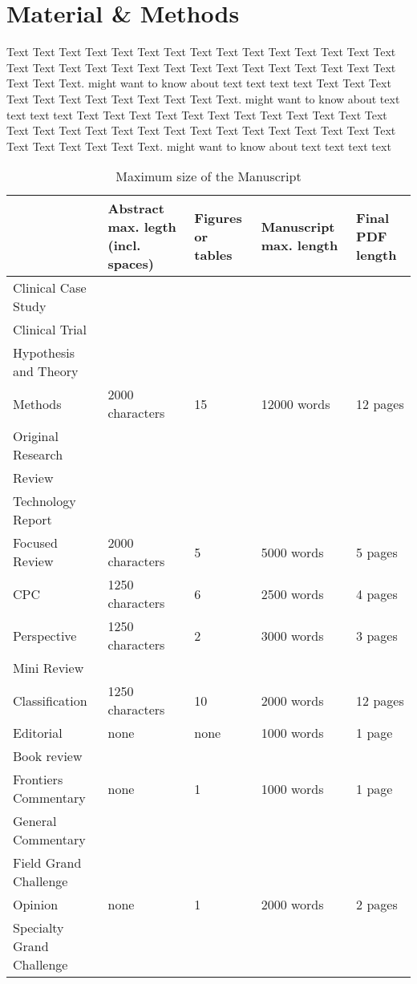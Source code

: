 \section{Material \& Methods}

Text Text Text Text Text Text  Text Text Text Text Text Text Text Text Text  Text Text Text Text Text Text Text Text Text Text  Text Text Text Text Text Text  Text Text.  \cite{Neuro2013} might want to know about  text text text text Text Text Text Text  Text Text Text Text Text Text  Text Text. \citep{Gene2012} might want to know about  text text text text
Text Text Text Text Text Text  Text Text Text Text Text Text Text Text Text  Text Text Text Text Text Text Text Text Text Text  Text Text Text Text Text Text  Text Text.  \cite{Neurobot2013} might want to know about  text text text text

\begin{table}
\caption{Maximum size of the Manuscript\label{Tab:01}}
{\begin{tabular}{lllll}
 & Abstract max. legth (incl. spaces) & Figures or tables & Manuscript max. length & Final PDF length\\\midrule
Clinical Case Study & & & &\\
Clinical Trial & & & &\\
Hypothesis and Theory & & & &\\
Methods & 2000 characters  & 15 & 12000 words & 12 pages\\
Original Research & & & &\\
Review & & & &\\
Technology Report & & & &\\
Focused Review & 2000 characters & 5 & 5000 words & 5 pages\\
CPC &  1250 characters& 6 & 2500 words & 4 pages\\
Perspective & 1250 characters & 2 & 3000 words & 3 pages\\
Mini Review & & & &\\
Classification & 1250 characters & 10 & 2000 words & 12 pages\\
Editorial & none & none & 1000 words & 1 page \\
Book review & & & &\\
Frontiers Commentary & none & 1 & 1000 words & 1 page\\
General Commentary & & & &\\
Field Grand Challenge & & & &\\
Opinion & none & 1 & 2000 words & 2 pages\\
Specialty Grand Challenge& & & &\\
\end{tabular}}{}
\end{table}

